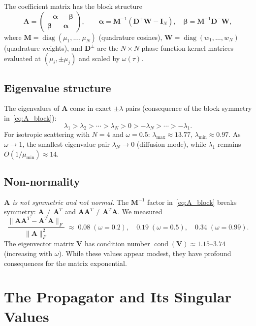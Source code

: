 \documentclass[11pt,a4paper]{article}
\newcommand{\diag}{\operatorname{diag}}
\newcommand{\cond}{\operatorname{cond}}
\newcommand{\mat}[1]{\mathbf{#1}}
\theoremstyle{definition}
\begin{document}
The coefficient matrix has the block structure
\begin{equation}\label{eq:A_block}
  \mat{A} = \begin{pmatrix} -\mat{\alpha} & -\mat{\beta} \\
                              \mat{\beta}  &  \mat{\alpha} \end{pmatrix},
  \qquad
  \mat{\alpha} = \mat{M}^{-1}(\mat{D}^+\mat{W} - \mat{I}_N),
  \quad
  \mat{\beta}  = \mat{M}^{-1}\mat{D}^-\mat{W},
\end{equation}
where $\mat{M}=\diag(\mu_1,\dots,\mu_N)$ (quadrature cosines),
$\mat{W}=\diag(w_1,\dots,w_N)$ (quadrature weights), and
$\mat{D}^\pm$ are the $N\times N$ phase-function kernel matrices evaluated at
$(\mu_i, \pm\mu_j)$ and scaled by $\omega(\tau)$.

\subsection{Eigenvalue structure}
The eigenvalues of $\mat{A}$ come in exact $\pm\lambda$ pairs
(consequence of the block symmetry in~\eqref{eq:A_block}):
\[
  \lambda_1 > \lambda_2 > \cdots > \lambda_N > 0 > -\lambda_N > \cdots > -\lambda_1.
\]
For isotropic scattering with $N=4$ and $\omega=0.5$:
$\lambda_{\max}\approx 13.77$, $\lambda_{\min}\approx 0.97$.
As $\omega\to 1$, the smallest eigenvalue pair $\lambda_N\to 0$ (diffusion
mode), while $\lambda_1$ remains $O(1/\mu_{\min})\approx 14$.

\subsection{Non-normality}\label{sec:nonnormal}
\emph{$\mat{A}$ is not symmetric and not normal.}  The $\mat{M}^{-1}$ factor
in~\eqref{eq:A_block} breaks symmetry: $\mat{A}\neq\mat{A}^T$ and
$\mat{A}\mat{A}^T\neq\mat{A}^T\mat{A}$.  We measured
\begin{equation}
  \frac{\|\mat{A}\mat{A}^T - \mat{A}^T\mat{A}\|_F}{\|\mat{A}\|_F^2}
  \;\approx\; 0.08 \;(\omega=0.2),\quad 0.19 \;(\omega=0.5),\quad 0.34 \;(\omega=0.99).
\end{equation}
The eigenvector matrix $\mat{V}$ has condition number
$\cond(\mat{V})\approx 1.15$--$3.74$ (increasing with $\omega$).  While
these values appear modest, they have profound consequences for the matrix
exponential.


\section{The Propagator and Its Singular Values}\label{sec:propagator}
\end{document}
